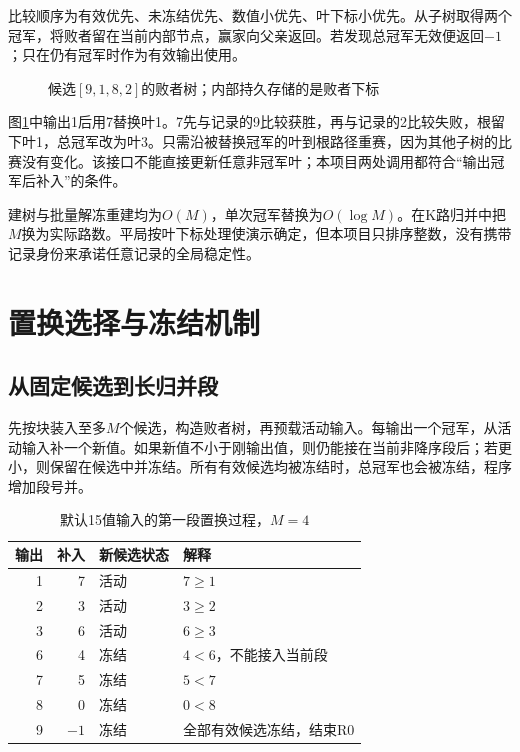 比较顺序为有效优先、未冻结优先、数值小优先、叶下标小优先。从子树取得两个冠军，将败者留在当前内部节点，赢家向父亲返回。若发现总冠军无效便返回$-1$；只在仍有冠军时作为有效输出使用。

\begin{figure}[htbp]\centering
{}\caption{候选$[9,1,8,2]$的败者树；内部持久存储的是败者下标}\label{fig:loser}\end{figure}

图\ref{fig:loser}中输出1后用7替换叶1。7先与记录的9比较获胜，再与记录的2比较失败，根留下叶1，总冠军改为叶3。只需沿被替换冠军的叶到根路径重赛，因为其他子树的比赛没有变化。该接口不能直接更新任意非冠军叶；本项目两处调用都符合“输出冠军后补入”的条件。

建树与批量解冻重建均为$O(M)$，单次冠军替换为$O(\log M)$。在K路归并中把$M$换为实际路数。平局按叶下标处理使演示确定，但本项目只排序整数，没有携带记录身份来承诺任意记录的全局稳定性。

\section{置换选择与冻结机制}
\subsection{从固定候选到长归并段}
先按块装入至多$M$个候选，构造败者树，再预载活动输入。每输出一个冠军，从活动输入补一个新值。如果新值不小于刚输出值，则仍能接在当前非降序段后；若更小，则保留在候选中并冻结。所有有效候选均被冻结时，总冠军也会被冻结，程序增加段号并。

\begin{table}[htbp]\centering\caption{默认15值输入的第一段置换过程，$M=4$}\label{tab:replacement}
\begin{tabular}{rrll}\toprule 输出 & 补入 & 新候选状态 & 解释\\\midrule
1 & 7 & 活动 & $7\ge1$\\
2 & 3 & 活动 & $3\ge2$\\
3 & 6 & 活动 & $6\ge3$\\
6 & 4 & 冻结 & $4<6$，不能接入当前段\\
7 & 5 & 冻结 & $5<7$\\
8 & 0 & 冻结 & $0<8$\\
9 & $-1$ & 冻结 & 全部有效候选冻结，结束R0\\\bottomrule
\end{tabular}\end{table}

